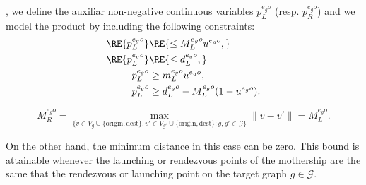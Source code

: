 \noindent
{}, we define the auxiliar non-negative continuous variables $p_L^{e_go}$ (resp. $p_R^{e_go}$) and we model the product by including the following constraints:
\begin{align*}
\RE{p_L^{e_go}} & \RE{\leq  M_L^{e_go}u^{e_go},}\\
\RE{p_L^{e_go}} & \RE{\leq d_L^{e_go},} \\
p_L^{e_go} & \geq m_L^{e_go} u^{e_go}, \\
p_L^{e_go} & \geq d_L^{e_go} - M_L^{e_go}(1-u^{e_go}).
\end{align*}

$$
M_R^{e_go} = \max_{\{v\in V_g\cup\{\text{origin}, \text{dest}\}, v'\in V_{g'}\cup\{\text{origin}, \text{dest}\} : g, g'\in\mathcal G\}} \|v - v'\| = M_L^{e_go}.
$$

\noindent
On the other hand, the minimum distance in this case can be zero. This bound is attainable whenever the launching or rendezvous points of the mothership are the same that the rendezvous or launching point on the target graph $g\in \mathcal{G}$.



